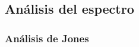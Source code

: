 \subsection{An\'alisis del espectro}
\subsubsection{An\'alisis de Jones}
\begin{comment}


\frame{
	\frametitle{Matrices de Jones}
	\begin{itemize}
		\item Para el polarizador inicial $0 \degree $ y el analizador $90 \degree$:
		\begin{equation}
			P=
			\begin{pmatrix}
				1&0\\
				0&0
			\end{pmatrix}
			\label{Jones:ec:pol}
		\end{equation}
	\begin{equation}
		A=
		\begin{pmatrix}
			0&0\\
			0&1
		\end{pmatrix}.
		\label{Jones:ec:An}
	\end{equation}
   \pause
    \item Para el retardador de media onda para cualquier \'angulo $\theta$ :
    \begin{equation}
    	HP(\theta)= e^{\frac{-i \pi}{2}}
    	\begin{pmatrix}
    		cos(\theta)^2 - \sin(\theta)^2 & 2 \cos(\theta) \sin(\theta)\\
    		2 cos(\theta) \sin(\theta)     & \sin(\theta)^2-\cos(\theta)^2
    	\end{pmatrix},
    	\label{Jones:ec:HWP1}
    \end{equation}
    si $\theta=-22.5 \degree$:
    \begin{equation}
    	HP(-22.5\degree)= - \frac{1}{\sqrt{2}} i 
    	\begin{pmatrix}
    		1 & 1\\
    		1  & -1
    	\end{pmatrix},
    	\label{Jones:ec:HWP2}
    \end{equation}
    

\end{comment}
